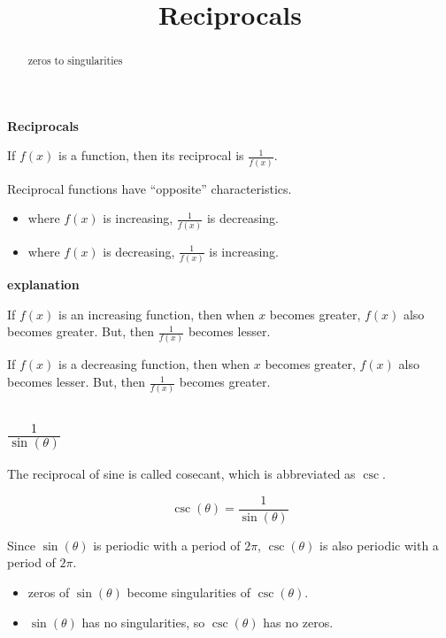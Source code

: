 \documentclass{ximera}
\title{Reciprocals}
\begin{document}
\begin{abstract}
zeros to singularities
\end{abstract}
\maketitle



\begin{idea} \textbf{\textcolor{blue!55!black}{Reciprocals}}


If $f(x)$ is a function, then its reciprocal is $\frac{1}{f(x)}$.

Reciprocal functions have ``opposite'' characteristics.




\begin{itemize}
\item where $f(x)$ is increasing, $\frac{1}{f(x)}$ is decreasing.
\item where $f(x)$ is decreasing, $\frac{1}{f(x)}$ is increasing.
\end{itemize}


\textbf{\textcolor{red!75!green}{explanation}} 

If $f(x)$ is an increasing function, then when $x$ becomes greater, $f(x)$ also becomes greater.  But, then $\frac{1}{f(x)}$ becomes lesser.

If $f(x)$ is a decreasing function, then when $x$ becomes greater, $f(x)$ also becomes lesser.  But, then $\frac{1}{f(x)}$ becomes greater.

\end{idea}






\subsection*{$\frac{1}{\sin(\theta)}$}


The reciprocal of sine is called cosecant, which is abbreviated as $\csc$.


\[
\csc(\theta) = \frac{1}{\sin(\theta)}
\]


Since $\sin(\theta)$ is periodic with a period of $2 \pi$, $\csc(\theta)$ is also periodic with a period of $2 \pi$.



\begin{itemize}
\item zeros of $\sin(\theta)$ become singularities of $\csc(\theta)$.
\item $\sin(\theta)$ has no singularities, so $\csc(\theta)$ has no zeros.
\end{itemize}
\end{document}
